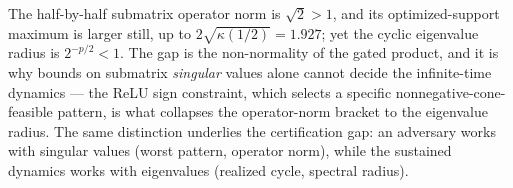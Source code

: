 \begin{remark}\label{rem:sv-vs-ev}
The half-by-half submatrix operator norm is $\sqrt2>1$, and its optimized-support maximum is larger
still, up to $2\sqrt{\kappa(1/2)}=1.927$; yet the cyclic eigenvalue radius is $2^{-p/2}<1$. The gap is
the non-normality of the gated product, and it is why bounds on submatrix \emph{singular} values alone
cannot decide the infinite-time dynamics --- the ReLU sign constraint, which selects a specific
nonnegative-cone-feasible pattern, is what collapses the operator-norm bracket to the eigenvalue radius.
The same distinction underlies the certification gap: an adversary works with singular values (worst
pattern, operator norm), while the sustained dynamics works with eigenvalues (realized cycle, spectral
radius).
\end{remark}
